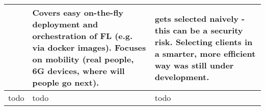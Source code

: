 \begin{changemargin}{-2cm}{0cm}
\begin{tabular}{|c||m{0.45\paperwidth}|m{0.35\paperwidth}|}
            &
            Covers easy on-the-fly deployment and orchestration of FL (e.g. via docker images).
            Focuses on mobility (real people, 6G devices, where will people go next).
            &
            gets selected naively - this can be a security risk.
            Selecting clients in a smarter, more efficient way was still under development.
        \\
        \hline
            todo
            &
            todo
            &
            todo
        \\
        \hline
    \end{tabular}
\end{changemargin}

